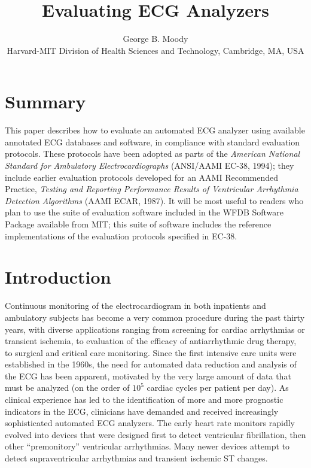
\title{Evaluating ECG Analyzers}
\author{George B. Moody\\
Harvard-MIT Division of Health Sciences and Technology, Cambridge, MA, USA}
\date{}


\topmargin -0.5625in
\oddsidemargin -0.25in
\evensidemargin -0.25in
\def\columnsep{0.3125 in}
\def\textwidth{6.875 in}
\def\textheight{224 mm}
\flushbottom
\setcounter{page}{100}

\maketitle

\section*{Summary}
This paper describes how to evaluate an automated ECG analyzer using
available annotated ECG databases and software, in compliance with
standard evaluation protocols.  These protocols have been adopted as
parts of the {\em American National Standard for Ambulatory
Electrocardiographs} (ANSI/AAMI EC-38, 1994);  they include earlier
evaluation protocols developed for an AAMI Recommended Practice,
{\em Testing and Reporting Performance Results of Ventricular Arrhythmia
Detection Algorithms} (AAMI ECAR, 1987).  It will be most useful
to readers who plan to use the suite of evaluation software included
in the WFDB Software Package available from MIT;  this suite of software
includes the reference implementations of the evaluation protocols
specified in EC-38.

\section{Introduction}
Continuous monitoring of the electrocardiogram in both inpatients and
ambulatory subjects has become a very common procedure during the past
thirty years, with diverse applications ranging from screening for cardiac
arrhythmias or transient ischemia, to evaluation of the efficacy of
antiarrhythmic drug therapy, to surgical and critical care monitoring.
Since the first intensive care units were established in the 1960s,
the need for automated data reduction and analysis of the ECG has been
apparent, motivated by the very large amount of data that must be
analyzed (on the order of $10^{5}$ cardiac cycles per patient per
day).  As clinical experience has led to the identification of more
and more prognostic indicators in the ECG, clinicians have demanded
and received increasingly sophisticated automated ECG analyzers.  The
early heart rate monitors rapidly evolved into devices that were
designed first to detect ventricular fibrillation, then other
``premonitory'' ventricular arrhythmias.  Many newer devices attempt
to detect supraventricular arrhythmias and transient ischemic ST
changes.

